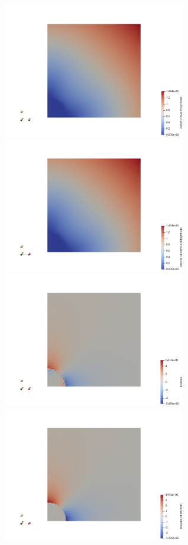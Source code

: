 \documentclass[a4paper]{article}
\begin{document}
\begin{center}
\includegraphics[width=8cm]{./results/benchmark_solvi/vel}
\includegraphics[width=8cm]{./results/benchmark_solvi/vel_analytical}\\
\includegraphics[width=8cm]{./results/benchmark_solvi/press}
\includegraphics[width=8cm]{./results/benchmark_solvi/press_analytical}
\end{center}
\end{document}
